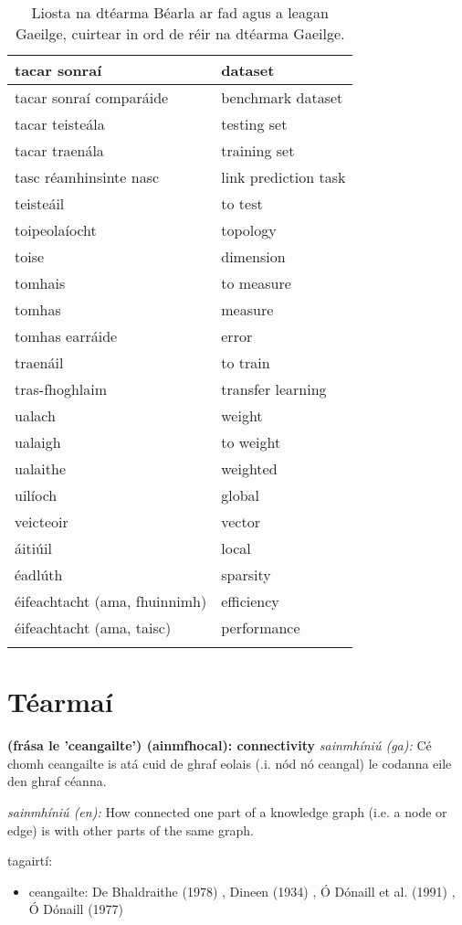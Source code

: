 \documentclass{article}
\begin{document}
\begin{longtable}{|l|l|}
		tacar sonraí&dataset\\ \hline 
		tacar sonraí comparáide&benchmark dataset\\ \hline 
		tacar teisteála&testing set\\ \hline 
		tacar traenála&training set\\ \hline 
		tasc réamhinsinte nasc&link prediction task\\ \hline 
		teisteáil&to test\\ \hline 
		toipeolaíocht&topology\\ \hline 
		toise&dimension\\ \hline 
		tomhais&to measure\\ \hline 
		tomhas&measure\\ \hline 
		tomhas earráide&error\\ \hline 
		traenáil&to train\\ \hline 
		tras-fhoghlaim&transfer learning\\ \hline 
		ualach&weight\\ \hline 
		ualaigh&to weight\\ \hline 
		ualaithe&weighted\\ \hline 
		uilíoch&global\\ \hline 
		veicteoir&vector\\ \hline 
		áitiúil&local\\ \hline 
		éadlúth&sparsity\\ \hline 
		éifeachtacht (ama, fhuinnimh)&efficiency\\ \hline 
		éifeachtacht (ama, taisc)&performance\\ \hline 
\caption{Liosta na dtéarma Béarla ar fad agus a leagan Gaeilge, cuirtear in ord de réir na dtéarma Gaeilge.}
\label{tab-terms-ga-en}
\end{longtable}

\section{Téarmaí}
\textbf{(frása le 'ceangailte') (ainmfhocal): connectivity}
\textit{sainmhíniú (ga):} Cé chomh ceangailte is atá cuid de ghraf eolais (.i. nód nó ceangal) le codanna eile den ghraf céanna.

\textit{sainmhíniú (en):} How connected one part of a knowledge graph (i.e. a node or edge) is with other parts of the same graph.

tagairtí:
\begin{itemize}
	\item ceangailte: De Bhaldraithe (1978) \cite{de-bhaldraithe}, Dineen (1934) \cite{dineen}, Ó Dónaill et al. (1991) \cite{focloir-beag}, Ó Dónaill (1977) \cite{odonaill}
\end{itemize}
\end{document}
